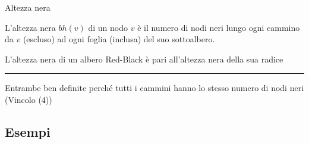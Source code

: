 \begin{frame}{Altezza nera}

\vspace{-9pt}
\begin{myboxtitle}
L'\alert{altezza nera $\mathit{bh}(v)$ di un nodo $v$} è il numero di nodi neri lungo ogni cammino da $v$ (escluso) ad ogni foglia (inclusa) del suo sottoalbero.
\end{myboxtitle}

\begin{myboxtitle}
L'\alert{altezza nera di un albero Red-Black} è pari all'altezza nera della sua radice
\end{myboxtitle}


\vspace{48pt}
\hrule

\vspace{6pt}
Entrambe ben definite perché tutti i cammini hanno lo stesso numero di nodi neri (Vincolo (4))

\end{frame}

\subsection{Esempi}

